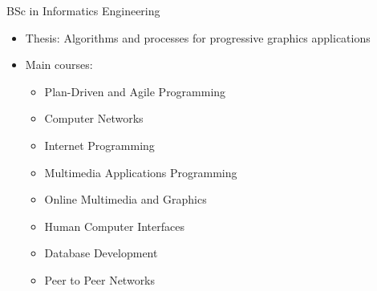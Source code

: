 \documentclass[a4paper,12pt]{memoir} %
\begin{document}
\userinformation %

\framebreak %









 {BSc in Informatics Engineering}
\begin{itemize}
\item Thesis: \small Algorithms and processes for progressive graphics applications
\item Main courses:
		\begin{itemize}
			\item \small Plan-Driven and Agile Programming
			\item \small Computer Networks
			\item \small Internet Programming
			\item \small Multimedia Applications Programming
			\item \small Online Multimedia and Graphics
			\item \small Human Computer Interfaces
			\item \small Database Development
			\item \small Peer to Peer Networks
		\end{itemize}
\end{itemize}


\end{document}
